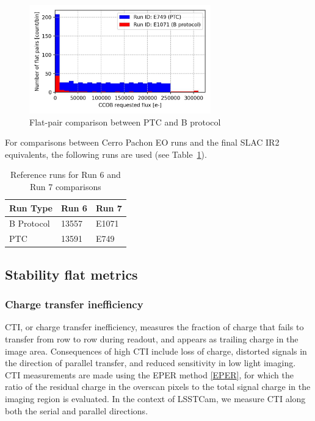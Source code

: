 \begin{figure}[H]
\begin{centering}
\includegraphics[width=0.7\textwidth]{figures/baselineCharacterization/PTC_BProtocol_Comparison.jpg}
	\caption{Flat-pair comparison between PTC and B protocol
\label{fig:PTC_BProtocol_Comparison}}
\end{centering}
\end{figure}

For comparisons between Cerro Pachon EO runs and the final SLAC IR2 equivalents, the following runs are used (see Table~\ref{runTable-b-ptc}).

\begin{table}[h]
\centering
\caption{Reference runs for Run 6 and Run 7 comparisons} \label{runTable-b-ptc}
\begin{tabular}{lll}
\toprule
Run Type & Run 6 & Run 7 \\
\midrule
B Protocol & 13557 & E1071 \\
PTC        & 13591 & E749 \\
\bottomrule
\end{tabular}
\end{table}

\subsection{Stability flat metrics}\label{stability-flat-metrics}

\subsubsection{Charge transfer
inefficiency}\label{charge-transfer-inefficiency}

CTI, or charge transfer inefficiency, measures the fraction of charge that fails to transfer from row to row during readout, and appears as trailing charge in the image area. Consequences of high CTI include loss of charge, distorted signals in the direction of parallel transfer, and reduced sensitivity in low light imaging. CTI measurements are made using the EPER method \hyperref[EPER]{{[}EPER{]}}, for which the ratio of the residual charge in the overscan pixels to the total signal charge in the imaging region is evaluated. In the context of LSSTCam, we measure CTI along both the serial and parallel directions.

